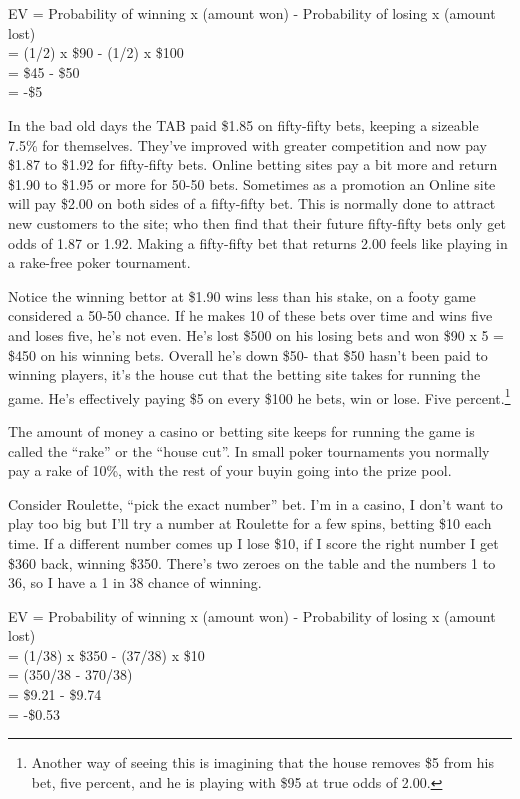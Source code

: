 EV = Probability of winning x (amount won) - Probability of losing x
(amount lost) \\
   = (1/2) x \$90 - (1/2) x \$100 \\
   = \$45 - \$50  \\
   = -\$5

In the bad old days
the TAB paid \$1.85 on fifty-fifty bets, keeping a sizeable 7.5\% for
themselves. They've improved with greater competition and now pay
\$1.87 to \$1.92 for fifty-fifty bets. Online betting sites pay a bit
more and return \$1.90 to \$1.95 or more for 50-50 bets. Sometimes as
a promotion an Online site will pay \$2.00 on both sides of a
fifty-fifty bet. This is normally done to attract new customers to the
site; who then find that their future fifty-fifty bets only get odds
of 1.87 or 1.92. Making a fifty-fifty bet that returns 2.00 feels like
playing in a rake-free poker tournament.


Notice the winning bettor at \$1.90 wins less than his stake,
on a footy game considered a 50-50 chance. If he makes 10 of these
bets over time and wins five and loses five, he's not even. He's lost
\$500 on his losing bets and won \$90 x 5 = \$450 on his winning bets.
Overall he's down \$50- that \$50 hasn't been paid to winning players,
it's the house cut that the betting site takes for running the game.
He's effectively paying \$5 on every \$100 he bets, win or lose.
Five percent.\footnote{Another way of seeing this is imagining that the
  house removes \$5 from his bet, five percent, and he is playing with
  \$95 at true odds of 2.00.}

The amount of money a casino or betting site keeps for running the
game is called the ``rake'' or the ``house cut''.
In small poker tournaments you normally pay a rake of 10\%, with the
rest of your buyin going into the prize pool.

Consider Roulette, ``pick the exact number'' bet. I'm in a casino,
I don't want to play too big but I'll try a number at Roulette for a few
spins, betting \$10 each time. If a different number comes up I lose \$10,
if I score the right number I get \$360 back, winning \$350. There's two
zeroes on the table and the numbers 1 to 36, so I have a 1 in 38 chance of
winning.

EV = Probability of winning x (amount won) - Probability of losing x
(amount lost) \\
   = (1/38) x \$350 - (37/38) x \$10 \\
   = (350/38 - 370/38)  \\
   = \$9.21 - \$9.74 \\
   = -\$0.53

